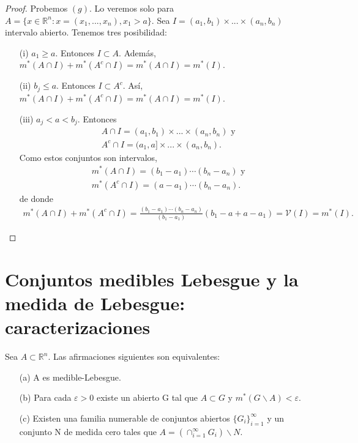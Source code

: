 \begin{proof}
Probemos $(g)$. Lo veremos solo para $A = \{x \in \mathbb{R}^n : x = (x_1,...,x_n), x_1 > a\}$. Sea $I = (a_1,b_1)\times ... \times (a_n,b_n)$ intervalo abierto. Tenemos tres posibilidad:
\begin{enumerate}
    \item[(i)] $a_1 \ge a$. Entonces $I \subset A$. Además, $m^*(A \cap I) + m^*(A^c \cap I) = m^*(A \cap I) = m^*(I)$.
    \item[(ii)] $b_j \leq a$. Entonces $I \subset A^c$. Así, $m^*(A \cap I) + m^*(A^c \cap I) = m^*(A \cap I) = m^*(I)$.
    \item[(iii)] $a_j < a < b_j$. Entonces
    \begin{align*}
        &A \cap I = (a_1,b_1) \times ... \times (a_n,b_n) \text{ y } \\
        &A^c \cap I =  (a_1,a] \times ... \times (a_n,b_n).
    \end{align*}
    Como estos conjuntos son intervalos,
    \begin{align*}
        &m^*(A \cap I) = (b_1 - a_1) \dotsb (b_n - a_n) \text{ y } \\
        &m^*(A^c \cap I) = (a - a_1) \dotsb (b_n - a_n).
    \end{align*}
    de donde
    \begin{align*}
        m^*(A \cap I) + m^*(A^c \cap I) = \frac{(b_1 - a_1)\dotsb (b_n - a_n)}{(b_1 - a_1)}(b_1 - a + a - a_1) = \mathcal{V}(I) = m^*(I).
    \end{align*}
\end{enumerate}
\end{proof}

\newpage
\section{Conjuntos medibles Lebesgue y la medida de Lebesgue: caracterizaciones}

\begin{teo}
Sea $A \subset \mathbb{R}^n$. Las afirmaciones siguientes son equivalentes:
\begin{enumerate}
    \item[(a)] A es medible-Lebesgue.
    \item[(b)] Para cada $\varepsilon > 0$ existe un abierto G tal que $A \subset G$ y $m^*(G \backslash A) < \varepsilon$.
    \item[(c)] Existen una familia numerable de conjuntos abiertos $\{G_i\}_{i=1}^{\infty}$ y un conjunto N de medida cero tales que $A = (\cap_{i=1}^{\infty}{G_i}) \backslash N$.
\end{enumerate}
\end{teo}

